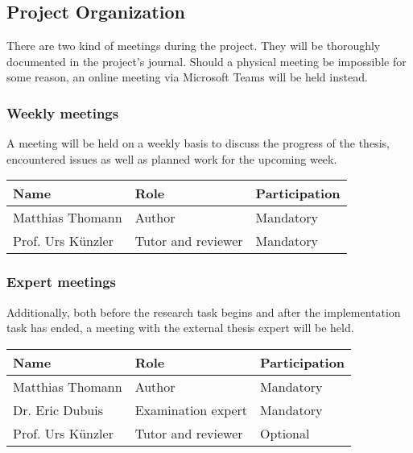\subsection{Project Organization}
There are two kind of meetings during the project. They will be thoroughly documented in the project's journal.
Should a physical meeting be impossible for some reason, an online meeting via Microsoft Teams will be held instead.

\subsubsection{Weekly meetings}
A meeting will be held on a weekly basis to discuss the progress of the thesis, encountered issues as well as planned work for the upcoming week.
\emptyline
\noindent\begin{tabular}{|l|l|l|}
    \hline
    \textbf{Name}       & \textbf{Role}         & \textbf{Participation}\\ \hline
    Matthias Thomann    & Author                & Mandatory             \\ \hline
    Prof. Urs Künzler   & Tutor and reviewer    & Mandatory             \\ \hline
\end{tabular}

\clearpage

\subsubsection{Expert meetings}
Additionally, both before the research task begins and after the implementation task has ended, a meeting with the external thesis expert will be held.
\emptyline
\noindent\begin{tabular}{|l|l|l|}
    \hline
    \textbf{Name}       & \textbf{Role}         & \textbf{Participation}\\ \hline
    Matthias Thomann    & Author                & Mandatory             \\ \hline
    Dr. Eric Dubuis     & Examination expert    & Mandatory             \\ \hline
    Prof. Urs Künzler   & Tutor and reviewer    & Optional              \\ \hline
\end{tabular}
\emptyline



